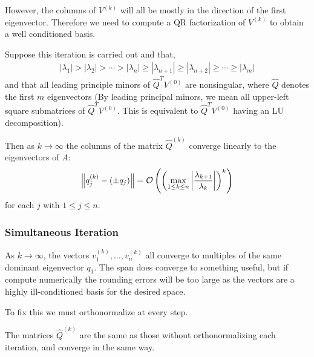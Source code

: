 \documentclass[12pt]{article}
\begin{document}
However, the columns of \( V^{(k)} \) will all be mostly in the direction of the first eigenvector. Therefore we need to compute a QR factorization of \( V^{(k)} \) to obtain a well conditioned basis.

\begin{theorem}
Suppose this iteration is carried out and that,
\begin{align*}
    |\lambda_1| > |\lambda_2| > \cdots > |\lambda_n| \geq |\lambda_{n+1}| \geq |\lambda_{n+2}| \geq \cdots \geq |\lambda_m|
\end{align*}
and that all leading principle minors of \( \hat{Q}^T V^{(0)} \) are nonsingular, where \( \hat{Q} \) denotes the first \( m \) eigenvectors (By leading principal minors, we mean all upper-left square submatrices of \( \hat{Q}^T V^{(0)} \). This is equivalent to \( \hat{Q}^T V^{(0)} \) having an LU decomposition).

Then as \( k\to\infty \) the columns of the matrix \( \hat{Q}^{(k)} \) converge linearly to the eigenvectors of \( A \):
\begin{align*}
    \left\lVert q_j^{(k)} - (\pm q_j)\right\rVert = \mathcal{O} \left( \left( \max_{1\leq k\leq n} \left| \dfrac{\lambda_{k+1}}{\lambda_k} \right| \right)^k \right)
\end{align*}
for each \( j \) with \( 1\leq j\leq n \).
\end{theorem}

\subsubsection{Simultaneous Iteration}
As \( k\to\infty \), the vectors \( v_1^{(k)}, \ldots, v_n^{(k)} \) all converge to multiples of the same dominant eigenvector \( q_1 \). The span does converge to something useful, but if compute numerically the rounding errors will be too large as the vectors are a highly ill-conditioned basis for the desired space.

To fix this we must orthonormalize at every step.

\begin{algorithm}
\begin{algorithmic}
\EndFor
\end{algorithmic}
\end{algorithm}

\begin{theorem}
The matrices \( \hat{Q}^{(k)} \) are the same as those without orthonormalizing each iteration, and converge in the same way.
\end{theorem}
\end{document}
